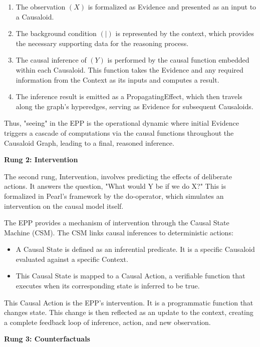 \begin{enumerate}
    \item The observation $(X)$ is formalized as Evidence and presented as an input to a Causaloid.
    \item The background condition $(|)$ is represented by the context, which provides the necessary supporting data for the reasoning process.
    \item The causal inference of $(Y)$ is performed by the causal function embedded within each Causaloid. This function takes the Evidence and any required information from the Context as its inputs and computes a result.
    \item The inference result is emitted as a PropagatingEffect, which then travels along the graph's hyperedges, serving as Evidence for subsequent Causaloids.
\end{enumerate}

Thus, "seeing" in the EPP is the operational dynamic where initial Evidence triggers a cascade of computations via the causal functions throughout the Causaloid Graph, leading to a final, reasoned inference.

\textbf{Rung 2: Intervention}

The second rung, Intervention, involves predicting the effects of deliberate actions. It answers the question, "What would Y be if we do X?" This is formalized in Pearl's framework by the do-operator, which simulates an intervention on the causal model itself.

The EPP provides a mechanism of intervention through the Causal State Machine (CSM).
The CSM links causal inferences to deterministic actions:

\begin{itemize}
    \item A Causal State is defined as an inferential predicate. It is a specific Causaloid evaluated against a specific Context.
    \item This Causal State is mapped to a Causal Action, a verifiable function that executes when its corresponding state is inferred to be true.

\end{itemize}

This Causal Action is the EPP's intervention. It is a programmatic function that changes state.
This change is then reflected as an update to the context, creating a complete feedback loop of inference, action, and new observation.

\textbf{Rung 3: Counterfactuals}

